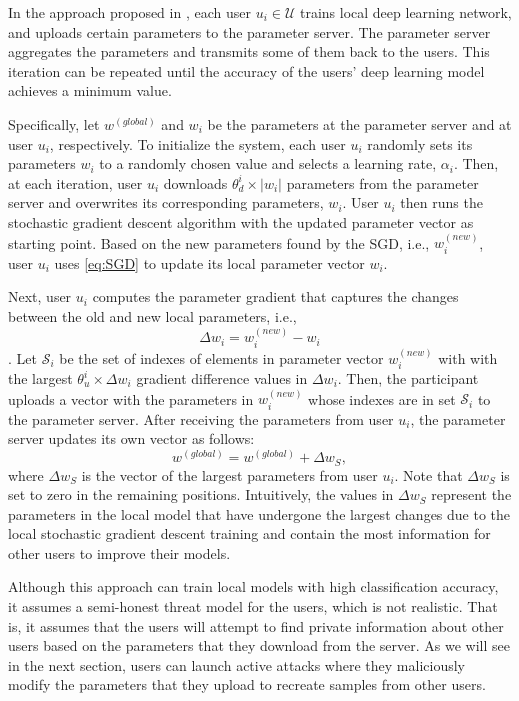 \documentclass[conference]{IEEEtran}
\begin{document}
In the approach proposed in \cite{shokri2015privacy}, each user $u_i\in\mathcal{U}$ trains local deep learning
network, and uploads certain parameters to the parameter server. The parameter server aggregates the parameters and transmits some of
them back to the users. This iteration can be repeated until the accuracy of the users' deep learning model achieves a minimum value. 

Specifically, let  $w^{(global)}$ and $w_i$ be the parameters at the parameter server and at user $u_i$, respectively. 
To initialize the system,  each user $u_i$ randomly sets its parameters $w_i$ to a randomly chosen value and selects a learning rate,
$\alpha_i$. Then, at each iteration,  user $u_i$  downloads $\theta_d^{i} \times |w_i|$ parameters from the parameter server and
overwrites its corresponding parameters, $w_i$. User $u_i$ then runs the stochastic gradient descent algorithm
with the updated parameter vector as starting point. Based on the new parameters found by the SGD, i.e., $w_i^{(new)}$, user
$u_i$ uses \eqref{eq:SGD} to update its local parameter vector $w_i$. 

Next, user $u_i$ computes the parameter gradient that captures the changes between the old and new local parameters, i.e., 
$$\Delta w_i =  w_i^{(new)} -  w_i$$. 
Let $\mathcal{S}_i$ be the set of indexes of elements in parameter vector $w_i^{(new)}$ with 
with the largest  $\theta_u^{i} \times \Delta w_i$ gradient difference values in $\Delta w_i$. 
Then, the participant uploads a vector with the parameters in $w_i^{(new)}$ whose indexes are in set $\mathcal{S}_i$ to the parameter
server.  After receiving the parameters from user $u_i$, the parameter server updates its own vector as follows:
$$w^{(global)} =  w^{(global)} +  \Delta w_S,$$
where $\Delta w_S$ is the vector of the largest parameters from user $u_i$. Note that $\Delta w_S$  is set to zero in the remaining
positions. Intuitively, the  values in $\Delta w_S$ represent the parameters in the local model that have undergone the largest
changes due to the local stochastic gradient descent training and contain the most information for other users to improve their models.


Although this approach can train local models with high classification accuracy,  it assumes a semi-honest threat model for the users,
which is not realistic. That is, it assumes that the users will attempt to find private information about other users based on the parameters that they
download from the server. As we will see in the next section, users can launch active attacks where they maliciously modify the
parameters that they upload to recreate samples from other users. 
\end{document}
